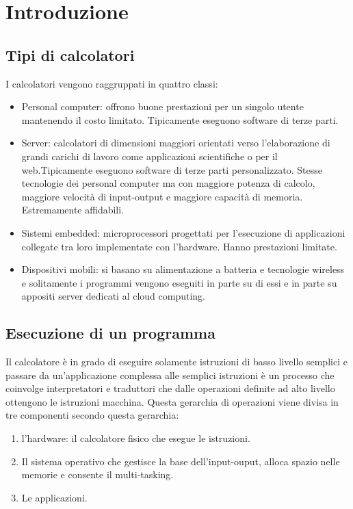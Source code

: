 \chapter{Introduzione}
\section{Tipi di calcolatori}
I calcolatori vengono raggruppati in quattro classi:
\begin{itemize}
\item Personal computer: offrono buone prestazioni per un singolo utente mantenendo il costo limitato. Tipicamente eseguono software di terze parti.
\item Server: calcolatori di dimensioni maggiori orientati verso l'elaborazione di grandi carichi di lavoro come applicazioni scientifiche o per il web.Tipicamente eseguono 
software di terze parti personalizzato. Stesse tecnologie dei personal computer ma con maggiore potenza di calcolo, maggiore velocit\`a di input-output e maggiore capacit\`a di
memoria. Estremamente affidabili.
\item Sistemi embedded: microprocessori progettati per l'esecuzione di applicazioni collegate tra loro implementate con l'hardware. Hanno prestazioni limitate.
\item Dispositivi mobili: si basano su alimentazione a batteria e tecnologie wireless e solitamente i programmi vengono eseguiti in parte su di essi e in parte su appositi 
server dedicati al cloud computing.
\end{itemize}
\section{Esecuzione di un programma}
Il calcolatore \`e in grado di eseguire solamente istruzioni di basso livello semplici e passare da un'applicazione complessa alle semplici istruzioni \`e un processo che \\
coinvolge interpretatori e traduttori che dalle operazioni definite ad alto livello ottengono le istruzioni macchina. Questa gerarchia di operazioni viene divisa in tre 
componenti secondo questa gerarchia:
\begin{enumerate}
\item l'hardware: il calcolatore fisico che esegue le istruzioni.
\item Il sistema operativo che gestisce la base dell'input-ouput, alloca spazio nelle memorie e consente il multi-tasking.
\item Le applicazioni.
\end{enumerate}
